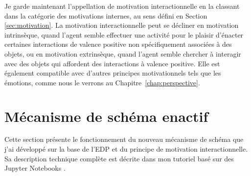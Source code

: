 Je garde maintenant l'appellation de motivation interactionnelle en la classant dans la catégorie des motivations internes, au sens défini en Section \ref{sec:motivation}.
La motivation interactionnelle peut se décliner en motivation intrinsèque, quand l'agent semble effectuer une activité pour le plaisir d'énacter certaines interactions de valence positive non spécifiquement associées à des objets, ou en motivation extrinsèque, quand l'agent semble chercher à interagir avec des objets qui affordent des interactions à valence positive.
Elle est également compatible avec d'autres principes motivationnels tels que les émotions, comme nous le verrons au Chapitre~\ref{chap:perspective}.






\section{Mécanisme de schéma enactif}
\label{sec:mse}

\noindent
Cette section présente le fonctionnement du nouveau mécanisme de schéma que j'ai développé sur la base de l'EDP et du principe de motivation interactionnelle. 
Sa description technique complète est décrite dans mon tutoriel basé sur des Jupyter Notebooks \cite{georgeon_schema_2025-1}. 

